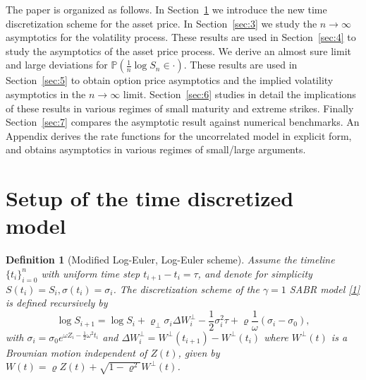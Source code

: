 \documentclass[11pt]{article}
\numberwithin{equation}{section}
\theoremstyle{plain}
\newtheorem{definition}[theorem]{Definition}
\begin{document}
The paper is organized as follows. In Section~\ref{sec:2} we introduce the
new time discretization scheme for the asset price. In Section~\ref{sec:3}
we study the $n\to \infty$ asymptotics for
the volatility process. These results are used in Section~\ref{sec:4}
to study the asymptotics of the asset price process. We derive an almost sure 
limit and large deviations for $\mathbb{P}(\frac{1}{n}\log S_n \in \cdot)$.
These results are used in Section~\ref{sec:5} to obtain option price asymptotics
and the implied volatility asymptotics in the $n\to \infty$ limit.
Section~\ref{sec:6} studies in detail the 
implications of these results in various regimes of small maturity and extreme 
strikes. 
Finally Section~\ref{sec:7} compares the asymptotic result against numerical 
benchmarks.  
An Appendix derives the rate functions for the uncorrelated model in explicit
form, and obtains asymptotics in various regimes of small/large arguments.



\section{Setup of the time discretized model}
\label{sec:2}

\begin{definition}[Modified Log-Euler, Log-Euler scheme]\label{def:1}
Assume the timeline $\{ t_i \}_{i=0}^n$ with uniform time step $t_{i+1}-t_{i}=\tau$, and
denote for simplicity $S(t_i) = S_i, \sigma(t_i)=\sigma_i$.
The discretization scheme of the $\gamma=1$ SABR model \eqref{1} is defined 
recursively by
\begin{equation}\label{scheme2iter}
\log S_{i+1} = \log S_{i} + \varrho_\perp \sigma_i \Delta W_i^\perp - \frac12 \sigma_i^2\tau 
+ \varrho \frac{1}{\omega} (\sigma_i - \sigma_0),
\end{equation}
with $\sigma_i = \sigma_0 e^{\omega Z_i - \frac12 \omega^2 t_i}$ and 
$\Delta W_i^\perp = W^\perp(t_{i+1}) - W^\perp(t_i)$ 
where $W^\perp(t)$ is a Brownian motion independent of $Z(t)$, given by
$W(t) = \varrho Z(t) + \sqrt{1-\varrho^2} W^\perp(t)$.
\end{definition}
\end{document}
